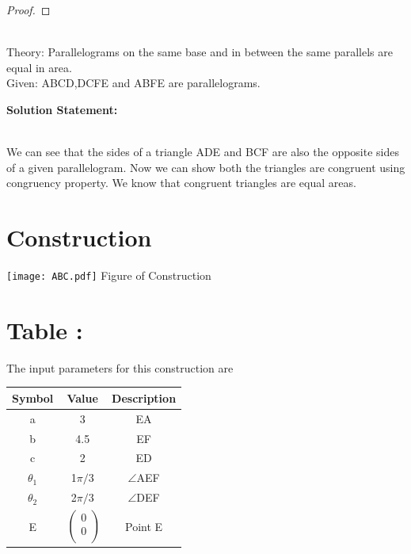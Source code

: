 \documentclass[10pt,a4paper]{report}
\begin{document}
\begin{multicols}{2}
\begin{proof}
	\end{proof}
	\iffalse
\vspace{0.5cm}\raggedright \\
Theory:
Parallelograms on the same base and in between the same parallels are equal in area.\\
Given: ABCD,DCFE and ABFE are parallelograms.
\vspace{2mm} \\ 
\raggedright \textbf{Solution Statement:}\vspace{2mm}
\raggedright \\We can see that the sides of a triangle ADE and BCF are also the opposite sides of a given parallelogram. Now we can show both the triangles are congruent using congruency property. We know that congruent triangles are equal areas.  \\
\vspace{5mm}
\section{Construction}
  \begin{center}
     \texttt{[image: ABC.pdf]} 
     Figure of Construction
   \end{center}
   \vspace{5mm}

\section{Table :}

The input parameters for this construction are 
\begin{center}
\begin{tabular}{|c|c|c|}
	\hline
	\textbf{Symbol}&\textbf{Value}&\textbf{Description}\\
	\hline
	a&3&EA\\
	\hline
	b&4.5&EF\\
	\hline
	c&2&ED\\
	\hline
	${\theta}_1$& 1$\pi/3$&$ \angle $AEF\\ 
	\hline
	${\theta}_2$& 2$\pi/3$&$ \angle $DEF\\ 
	    \hline
	E&$\
	\begin{pmatrix}
		0 \\
		0 \\
	\end{pmatrix}$%
	&Point E\\
	\hline
\end{tabular}
\end{center}


\end{multicols}
\end{document}
